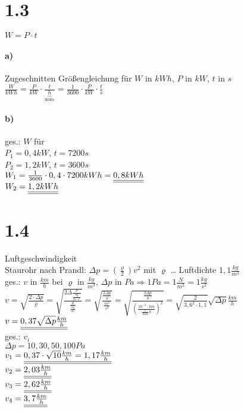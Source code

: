 \section*{1.3}
$\boxed{W=P\cdot t}$
\paragraph{a)} Zugeschnitten Größengleichung für $W$ in $kWh$, $P$ in $kW$, $t$ in $s$\\
$\frac{W}{kWh}=\frac{P}{kW}\cdot \frac{t}{\underbrace{h}_{3600s}}=\frac{1}{3600}\cdot \frac{P}{kW} \cdot \frac{t}{s}$

\paragraph{b)} ges.: $W$ für\\
$P_1=0,4kW$, $t=7200s$\\
$P_2=1,2kW$, $t=3600s$\medskip\\
$W_1=\frac{1}{3600} \cdot 0,4 \cdot 7200kWh=\underline{\underline{0,8kWh}}$\smallskip\\
$W_2=\underline{\underline{1,2kWh}}$

\section*{1.4}
Luftgeschwindigkeit\\
Staurohr nach Prandl: $\Delta p = (\frac{\varrho}{2})v^2$ mit $\varrho$ … Luftdichte $1,1 \frac{kg}{m^3}$\\
ges.: $v$ in $\frac{km}{h}$ bei $\varrho$ in $\frac{kg}{m^3}$, $\Delta p$ in $Pa \Rightarrow 1 Pa = 1\frac{N}{m^2}= 1 \frac{kg}{s^2}$\\
$v=\sqrt{\frac{2\cdot \Delta p}{\varrho}}=\sqrt{\frac{2\Delta \frac{p}{\frac{kg}{m\cdot s^2}}}{\frac{\varrho}{\frac{kg}{m^3}}}}=\sqrt{\frac{\frac{2\Delta p}{\varrho}}{\frac{m^2}{s^2}}}=\sqrt{\frac{\frac{2 \Delta p}{\varrho}}{(\frac{10^{-3}\cdot km}{\frac{1}{3600}h})^2}}=\sqrt{\frac{2}{3,6^2\cdot 1,1}}\sqrt{\Delta p}\frac{km}{h}$\\
$v=\underline{\underline{0,37\sqrt{\Delta p}\frac{km}{h}}}$\medskip\\
ges.: $v_i$\\
$\Delta p = 10,30,50,100 Pa$\\
$v_1=\underline{\underline{0,37\cdot \sqrt{10}\frac{km}{h}=1,17\frac{km}{h}}}$\\
$v_2=\underline{\underline{2,03\frac{km}{h}}}$\\
$v_3=\underline{\underline{2,62\frac{km}{h}}}$\\
$v_4=\underline{\underline{3,7 \frac{km}{h}}}$

